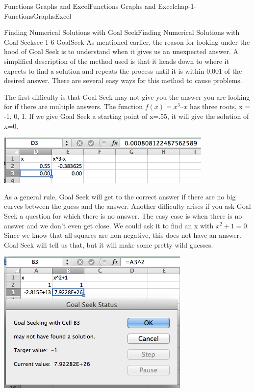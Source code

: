 \documentclass[oneside,10pt,]{book}
\numberwithin{equation}{section}
\begin{document}
\begin{chapterptx}{Functions Graphs and Excel}{}{Functions Graphs and Excel}{}{}{chap-1-FunctionsGraphsExcel}
\begin{sectionptx}{Finding Numerical Solutions with Goal Seek}{}{Finding Numerical Solutions with Goal Seek}{}{}{sec-1-6-GoalSeek}
As mentioned earlier, the reason for looking under the hood of Goal Seek is to understand when it gives us an unexpected answer.  A simplified description of the method used is that it heads down to where it expects to find a solution and repeats the process until it is within 0.001 of the desired answer.  There are several easy ways for this method to cause problems.%
\par
\hypertarget{p-495}{}%
The first difficulty is that Goal Seek may not give you the answer you are looking for if there are multiple answers.  The function \(f(x) = x^3 – x\) has three roots, x = -1, 0, 1.  If we give Goal Seek a starting point of x=.55, it will give the solution of x=0. \begin{sidebyside}{1}{0.1}{0.1}{0}%
\begin{sbspanel}{0.8}%
\includegraphics[width=1\linewidth]{images/sec1-6-13.png}
\end{sbspanel}%
\end{sidebyside}%
%
\par
\hypertarget{p-496}{}%
As a general rule, Goal Seek will get to the correct answer if there are no big curves between the guess and the answer. Another difficulty arises if you ask Goal Seek a question for which there is no answer.  The easy case is when there is no answer and we don't even get close.  We could ask it to find an x with \(x^2+1=0\).  Since we know that all squares are non-negative, this does not have an answer.  Goal Seek will tell us that, but it will make some pretty wild guesses. \begin{sidebyside}{1}{0.1}{0.1}{0}%
\begin{sbspanel}{0.8}%
\includegraphics[width=1\linewidth]{images/sec1-6-14.png}

\end{sbspanel}
\end{sidebyside}
\end{sectionptx}
\end{chapterptx}
\end{document}
